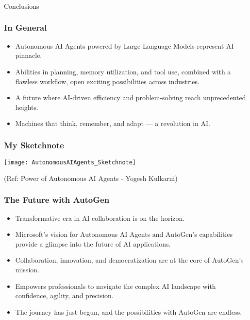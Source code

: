 \begin{frame}[fragile]\frametitle{}
\begin{center}
{\Large Conclusions}
\end{center}
\end{frame}

\begin{frame}[fragile]\frametitle{In General}
  \begin{itemize}
    \item Autonomous AI Agents powered by Large Language Models represent AI pinnacle.
    \item Abilities in planning, memory utilization, and tool use, combined with a flawless workflow, open exciting possibilities across industries.
    \item A future where AI-driven efficiency and problem-solving reach unprecedented heights.
    \item Machines that think, remember, and adapt — a revolution in AI.
  \end{itemize}
\end{frame}

\begin{frame}[fragile]\frametitle{My Sketchnote}
	
	\begin{center}
	\texttt{[image: AutonomousAIAgents\_Sketchnote]}
	\end{center}
{\tiny (Ref: Power of Autonomous AI Agents - Yogesh Kulkarni)}
\end{frame}

\begin{frame}[fragile]\frametitle{The Future with AutoGen}
  \begin{itemize}
    \item Transformative era in AI collaboration is on the horizon.
    \item Microsoft’s vision for Autonomous AI Agents and AutoGen's capabilities provide a glimpse into the future of AI applications.
    \item Collaboration, innovation, and democratization are at the core of AutoGen’s mission.
    \item Empowers professionals to navigate the complex AI landscape with confidence, agility, and precision.
    \item The journey has just begun, and the possibilities with AutoGen are endless.
  \end{itemize}
\end{frame}

